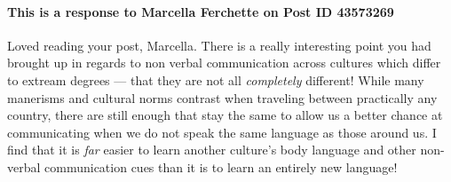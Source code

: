   \paragraph{This is a response to Marcella Ferchette on Post ID 43573269}
    Loved reading your post, Marcella. There is a really interesting point
      you had brought up in regards to non verbal communication across cultures
      which differ to extream degrees --- that they are not all
      \textit{completely} different! While many manerisms and cultural norms
      contrast when traveling between practically any country, there are still
      enough that stay the same to allow us a better chance at communicating
      when we do not speak the same language as those around us. I find that
      it is \textit{far} easier to learn another culture's body language and
      other non-verbal communication cues than it is to learn an entirely new
      language!
